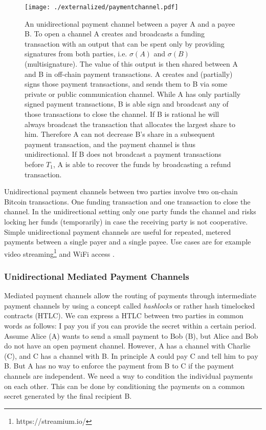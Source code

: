 \begin{figure}
\texttt{[image: ./externalized/paymentchannel.pdf]}
\caption{An unidirectional payment channel between a payer A and a payee B. To open a channel A creates and broadcasts a funding transaction with an output that can be spent only by providing signatures from both parties, i.e. $\sigma(A)$ and $\sigma(B)$ (multisignature). The value of this output is then shared between A and B in off-chain payment transactions. A creates and (partially) signs those payment transactions, and sends them to B via some private or public communication channel. While A has only partially signed payment transactions, B is able sign and broadcast any of those transactions to close the channel. If B is rational he will always broadcast the transaction that allocates the largest share to him. Therefore A can not decrease B's share in a subsequent payment transaction, and the payment channel is thus unidirectional. If B does not broadcast a payment transactions before $T_1$, A is able to recover the funds by broadcasting a refund transaction.}
\label{fig:paymentchannels}
\end{figure}

Unidirectional payment channels between two parties involve two on-chain Bitcoin transactions. One funding transaction and one transaction to close the channel. In the unidirectional setting only one party funds the channel and risks locking her funds (temporarily) in case the receiving party is not cooperative. Simple unidirectional payment channels are useful for repeated, metered payments between a single payer and a single payee. Use cases are for example video streaming\footnote{https://streamium.io/} and WiFi access \cite{Siby2013}.

\subsubsection{Unidirectional Mediated Payment Channels}

Mediated payment channels allow the routing of payments through intermediate payment channels by using a concept called \emph{hashlocks} or rather hash timelocked contracts (HTLC). We can express a HTLC between two parties in common words as follows: I pay you if you can provide the secret within a certain period. Assume Alice (A) wants to send a small payment to Bob (B), but Alice and Bob do not have an open payment channel. However, A has a channel with Charlie (C), and C has a channel with B. In principle A could pay C and tell him to pay B. But A has no way to enforce the payment from B to C if the payment channels are independent. We need a way to condition the individual payments on each other. This can be done by conditioning the payments on a common secret generated by the final recipient B. 

